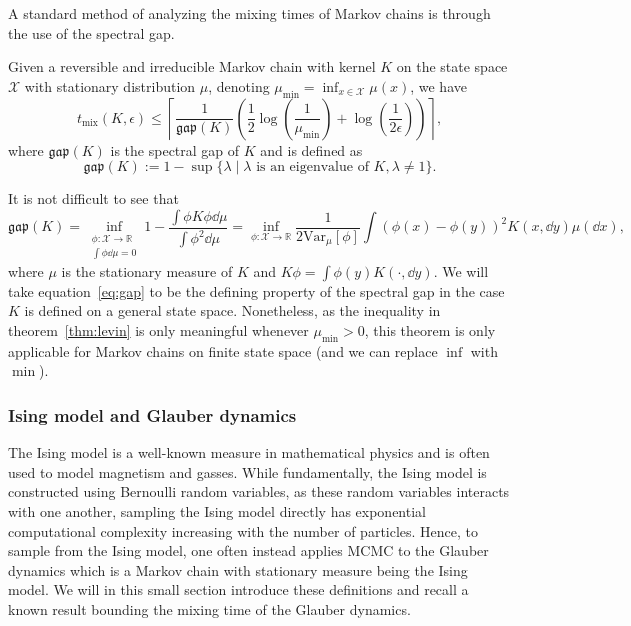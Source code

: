 A standard method of analyzing the mixing times of Markov chains is through the use of the spectral gap. 


\begin{theorem}\label{thm:levin}
  Given a reversible and irreducible Markov chain with kernel \(K\) on the state space \(\mathcal{X}\) 
  with stationary distribution \(\mu\), denoting \(\mu_{\min} = \inf_{x \in \mathcal{X}} \mu(x)\), we have 
  \[t_{\text{mix}}(K, \epsilon) \le \left\lceil\frac{1}{\mathfrak{gap}(K)}
  \left(\frac{1}{2}\log\left(\frac{1}{\mu_{\min}}\right) + \log\left(\frac{1}{2\epsilon}\right)\right)\right\rceil,\]
  where \(\mathfrak{gap}(K)\) is the spectral gap of \(K\) and is defined as
  \[\mathfrak{gap}(K) := 1 - \sup\{\lambda \mid \lambda \text{ is an eigenvalue of } K, \lambda \neq 1\}.\]
\end{theorem}

It is not difficult to see that 
\begin{equation}\label{eq:gap}
  \mathfrak{gap}(K) = 
    \inf_{\substack{\phi : \mathcal{X} \to \mathbb{R}\\ \int \phi \dd \mu = 0}} 1 
      - \frac{\int \phi K \phi \dd \mu}{\int \phi^2 \dd \mu}
    = \inf_{\phi : \mathcal{X} \to \mathbb{R}} 
      \frac{1}{2 \text{Var}_\mu[\phi]} \int (\phi(x) - \phi(y))^2 K(x, \dd y) \mu(\dd x),
\end{equation}
where \(\mu\) is the stationary measure of \(K\) and \(K\phi = \int \phi(y) K(\cdot, \dd y)\). We will take 
equation~\eqref{eq:gap} to be the defining property of the spectral gap in the case \(K\) is defined on 
a general state space. Nonetheless, as the inequality in theorem~\ref{thm:levin} is only meaningful whenever 
\(\mu_{\min} > 0\), this theorem is only applicable for Markov chains on finite state space 
(and we can replace \(\inf\) with \(\min\)).

\subsubsection{Ising model and Glauber dynamics}

The Ising model is a well-known measure in mathematical physics and is often used to model magnetism and 
gasses. While fundamentally, the Ising model is constructed using Bernoulli random variables, as these 
random variables interacts with one another, sampling the Ising model directly has exponential computational 
complexity increasing with the number of particles. Hence, to sample from the Ising model, one often instead 
applies MCMC to the Glauber dynamics which is a Markov chain with stationary measure being the Ising model.
We will in this small section introduce these definitions and recall a known result \cite{Anari_2020} 
bounding the mixing time of the Glauber dynamics.


